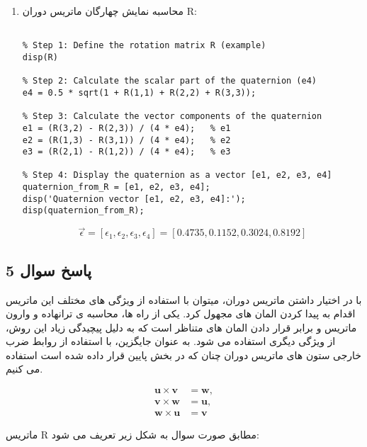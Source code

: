 \begin{enumerate}
\item 
محاسبه نمایش چهارگان ماتریس دوران R:

\begin{latin}
	\begin{lstlisting}[frame=single,style=Matlab-Pyglike]
		
% Step 1: Define the rotation matrix R (example)
disp(R)

% Step 2: Calculate the scalar part of the quaternion (e4)
e4 = 0.5 * sqrt(1 + R(1,1) + R(2,2) + R(3,3));

% Step 3: Calculate the vector components of the quaternion
e1 = (R(3,2) - R(2,3)) / (4 * e4);   % e1
e2 = (R(1,3) - R(3,1)) / (4 * e4);   % e2
e3 = (R(2,1) - R(1,2)) / (4 * e4);   % e3

% Step 4: Display the quaternion as a vector [e1, e2, e3, e4]
quaternion_from_R = [e1, e2, e3, e4];
disp('Quaternion vector [e1, e2, e3, e4]:');
disp(quaternion_from_R);

	\end{lstlisting}
\end{latin}
\[
\vec{\epsilon} = [\epsilon_{1}, \epsilon_{2}, \epsilon_{3}, \epsilon_{4}] = [0.4735, 0.1152, 0.3024, 0.8192]
\]

\end{enumerate}

\subsection{ پاسخ سوال 5}

با در اختیار داشتن ماتریس دوران، میتوان با استفاده از ویژگی های مختلف این ماتریس اقدام به پیدا کردن المان های مجهول کرد. یکی از راه ها، محاسبه ی ترانهاده و وارون ماتریس و برابر قرار دادن المان های متناظر است که به دلیل پیچیدگی زیاد این روش، از ویژگی دیگری استفاده می شود.
به عنوان جایگزین، با استفاده از روابط ضرب خارجی ستون های ماتریس دوران چنان که در بخش پایین قرار داده شده است استفاده می کنیم.

\begin{equation}
	\label{eq:cross_products}
	\begin{aligned}
		\mathbf{u} \times \mathbf{v} &= \mathbf{w}, \\
		\mathbf{v} \times \mathbf{w} &= \mathbf{u}, \\
		\mathbf{w} \times \mathbf{u} &= \mathbf{v}
	\end{aligned}
\end{equation}


ماتریس R مطابق صورت سوال به شکل زیر تعریف می شود:

